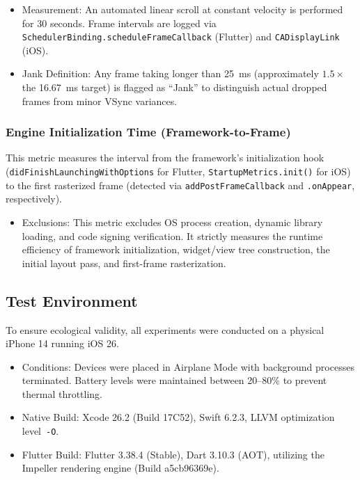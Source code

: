 \documentclass[journal]{IEEEtran}
\begin{document}
\begin{itemize}
	\item Measurement: An automated linear scroll at constant velocity is performed for 30 seconds. Frame intervals are logged via \texttt{Scheduler\-Binding.\-schedule\-Frame\-Callback} (Flutter) and \texttt{CADisplay\-Link} (iOS).
	\item Jank Definition: Any frame taking longer than 25~ms (approximately $1.5\times$ the 16.67~ms target) is flagged as
	      ``Jank'' to distinguish actual dropped frames from minor VSync variances.
\end{itemize}

\subsubsection{Engine Initialization Time (Framework-to-Frame)}
This metric measures the interval from the framework's initialization hook
(\texttt{didFinishLaunchingWithOptions} for Flutter, \texttt{StartupMetrics.init()} for iOS) to the first rasterized frame (detected via \texttt{addPostFrameCallback} and \texttt{.onAppear}, respectively).

\begin{itemize}
	\item Exclusions: This metric excludes OS process creation, dynamic library loading, and code signing
	      verification. It strictly measures the runtime efficiency of framework initialization, widget/view tree construction, the initial layout pass, and first-frame rasterization.
\end{itemize}

\subsection{Test Environment}
To ensure ecological validity, all experiments were conducted on a physical iPhone 14 running iOS 26.

\begin{itemize}
	\item Conditions: Devices were placed in Airplane Mode with background processes terminated. Battery
	      levels were maintained between 20--80\% to prevent thermal throttling.
	\item Native Build: Xcode 26.2 (Build 17C52), Swift 6.2.3, LLVM optimization level~\texttt{-O}.
	\item Flutter Build: Flutter 3.38.4 (Stable), Dart 3.10.3 (AOT), utilizing the
	      Impeller rendering engine (Build a5cb96369e).
\end{itemize}
\end{document}
